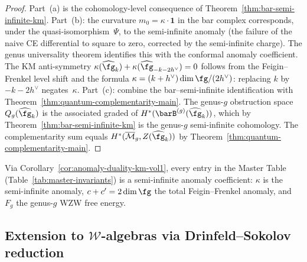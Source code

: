 \begin{proof}
Part~(a) is the cohomology-level consequence of
Theorem~\ref{thm:bar-semi-infinite-km}. Part~(b): the
curvature $m_0 = \kappa \cdot \mathbf{1}$ in the bar complex
corresponds, under the quasi-isomorphism~$\Psi$, to the
semi-infinite anomaly (the failure of the naive CE differential
to square to zero, corrected by the semi-infinite charge).
The genus universality theorem identifies this with the
conformal anomaly coefficient. The KM anti-symmetry
$\kappa(\widehat{\fg}_k) + \kappa(\widehat{\fg}_{-k-2h^\vee}) = 0$
follows from the Feigin--Frenkel level shift and the formula
$\kappa = (k+h^\vee)\dim\fg/(2h^\vee)$: replacing $k$ by
$-k - 2h^\vee$ negates~$\kappa$.
Part~(c): combine the bar--semi-infinite identification with
Theorem~\ref{thm:quantum-complementarity-main}. The genus-$g$
obstruction space $Q_g(\widehat{\fg}_k)$ is the associated
graded of $H^*(\barB^{(g)}(\widehat{\fg}_k))$, which by
Theorem~\ref{thm:bar-semi-infinite-km} is the genus-$g$
semi-infinite cohomology. The complementarity sum equals
$H^*(\overline{\mathcal{M}}_g, Z(\widehat{\fg}_k))$ by
Theorem~\ref{thm:quantum-complementarity-main}.
\end{proof}

\begin{remark}
\label{rem:master-table-brst}
Via Corollary~\ref{cor:anomaly-duality-km-vol1}, every entry in the Master Table (Table~\ref{tab:master-invariants}) is a semi-infinite anomaly coefficient: $\kappa$ is the semi-infinite anomaly, $c + c' = 2\dim\fg$ the total Feigin--Frenkel anomaly, and $F_g$ the genus-$g$ WZW free energy.
\end{remark}

\subsection{Extension to $\mathcal{W}$-algebras via Drinfeld--Sokolov reduction}

